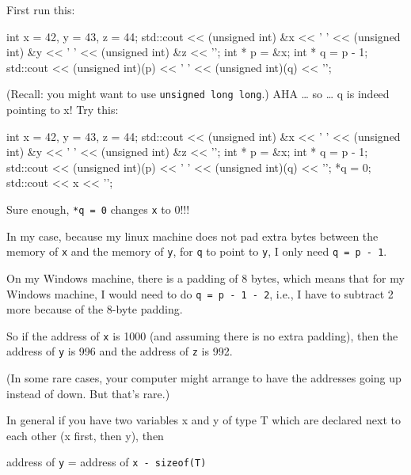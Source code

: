 First run this:

\begin{consolethree}[escapeinside=||]
int x = 42, y = 43, z = 44;
std::cout << (unsigned int) &x << ' '
          << (unsigned int) &y << ' '
          << (unsigned int) &z << '\n';
int * p = &x;
int * q = p - 1;
std::cout << (unsigned int)(p) << ' '
          << (unsigned int)(q) << '\n';
\end{consolethree}

(Recall: you might want to use \texttt{unsigned long long}.) AHA \ldots{} so \ldots{} q is indeed pointing to x! Try this:

\begin{consolethree}[escapeinside=||]
int x = 42, y = 43, z = 44;
std::cout << (unsigned int) &x << ' '
          << (unsigned int) &y << ' '
          << (unsigned int) &z << '\n';
int * p = &x;
int * q = p - 1;
std::cout << (unsigned int)(p) << ' '
          << (unsigned int)(q) << '\n';
*q = 0;
std::cout << x << '\n';
\end{consolethree}

Sure enough, \texttt{*q = 0} changes \texttt{x} to 0!!!

 In my case, because my linux machine does not pad extra bytes between the memory of \texttt{x} and the memory of \texttt{y}, for \texttt{q} to point to \texttt{y}, I only need \texttt{q = p - 1}.

On my Windows machine, there is a padding of 8 bytes, which means that for my Windows machine, I would need to do \texttt{q = p - 1 - 2}, i.e., I have to subtract 2 more because of the 8-byte padding.

So if the address of \texttt{x} is 1000 (and assuming there is no extra padding), then the address of \texttt{y} is 996 and the address of \texttt{z} is 992.

(In some rare cases, your computer might arrange to have the addresses going up instead of down. But that's rare.)

In general if you have two variables x and y of type T which are declared next to each other (x first, then y), then

address of \texttt{y} = address of \texttt{x - sizeof(T)}






